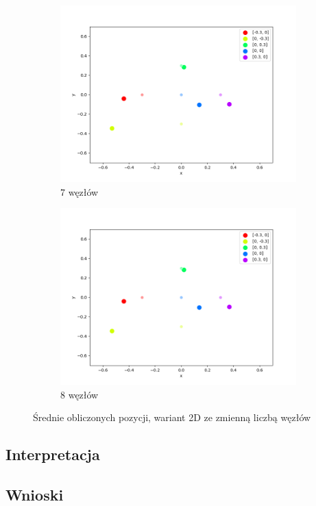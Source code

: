 \begin{figure}[h]
\begin{subfigure}{.5\textwidth}
    \includegraphics[width=\linewidth]{pics/mult_lat_2d_num/positions_3_mean.png}
\caption{7 węzłów}
\label{pic:2d_7_num_mult}
\end{subfigure}%
\begin{subfigure}{.5\textwidth}
    \centering
    \includegraphics[width=\linewidth]{pics/mult_lat_2d_num/positions_3_mean.png}
\caption{8 węzłów}
\label{pic:2d_8_num_mult}
\end{subfigure}
\caption{Średnie obliczonych pozycji, wariant 2D ze zmienną liczbą węzłów}
\label{pic:2d_num_mult}
\end{figure}

\subsection{Interpretacja}

\subsection{Wnioski}